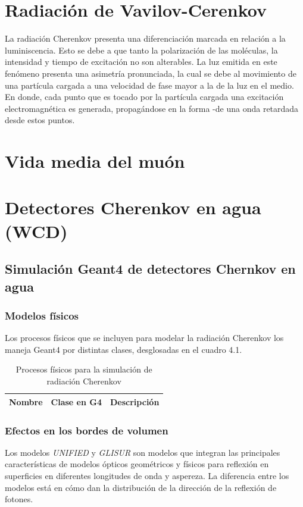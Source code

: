 \documentclass{book}
\begin{document}
\section{Radiaci\'on de Vavilov-Cerenkov}
La radiaci\'on Cherenkov presenta una diferenciaci\'on marcada en relaci\'on a la luminiscencia. Esto se debe a que tanto la polarizaci\'on de las mol\'eculas, la intensidad y tiempo de excitaci\'on no son alterables.  La luz emitida en este fen\'omeno presenta una asimetr\'ia pronunciada, la cual se debe al movimiento de una part\'icula cargada a una velocidad de fase mayor a la de la luz en el medio. En donde, cada punto que es tocado por la part\'icula cargada una excitaci\'on electromagn\'etica es generada, propag\'andose en la forma -de una onda retardada desde estos puntos.  \citep{CHERENKOV}

\section{Vida media del mu\'on}

\section{Detectores Cherenkov en agua (WCD)}

\subsection{Simulaci\'on Geant4 de detectores Chernkov en agua}

\subsubsection{Modelos f\'isicos}

Los procesos f\'isicos que se incluyen para modelar la radiaci\'on Cherenkov los maneja Geant4 por distintas clases, desglosadas en el cuadro 4.1.

\begin{table}[h]
\caption{ Procesos f\'isicos para la simulaci\'on de radiaci\'on Cherenkov}
\centering
\begin{tabular}{l c c}
\hline
Nombre & Clase en G4 & Descripci\'on\\ \hline

\hline
\end{tabular}
\end{table}

\subsubsection{Efectos en los bordes de volumen}
Los modelos \textit{UNIFIED} y \textit{GLISUR} son modelos que integran las principales caracter\'isticas de modelos \'opticos geom\'etricos y f\'isicos para reflexi\'on en superficies en diferentes longitudes de onda y aspereza. La diferencia entre los modelos est\'a en c\'omo dan la distribuci\'on de la direcci\'on de la reflexi\'on de fotones.
\end{document}
